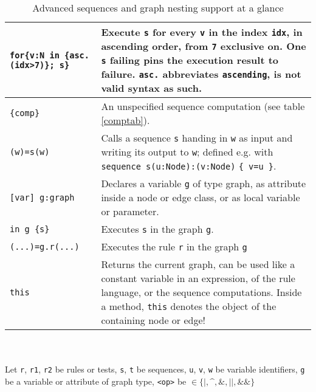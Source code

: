 \begin{table}[htbp]
\begin{minipage}{\linewidth}
\begin{tabularx}{\linewidth}{|lX|}
\texttt{for\{v:N in \{asc.(idx>7)\}; s\}} & Execute \texttt{s} for every \texttt{v} in the index \texttt{idx}, in ascending order, from \texttt{7} exclusive on. One \texttt{s} failing pins the execution result to failure. \texttt{asc.} abbreviates \texttt{ascending}, is not valid syntax as such.\\
\hline
\texttt{\{comp\}}	& An unspecified sequence computation (see table \ref{comptab}).\\
\hline
\texttt{(w)=s(w)} & Calls a sequence \texttt{s} handing in \texttt{w} as input and writing its output to \texttt{w}; defined e.g. with \texttt{sequence s(u:Node):(v:Node)} \texttt{\{ v=u \}}.\\
\hline
\hline
\texttt{[var] g:graph}	& Declares a variable \texttt{g} of type graph, as attribute inside a node or edge class, or as local variable or parameter.\\
\hline
\texttt{in g \{s\}}	& Executes \texttt{s} in the graph \texttt{g}.\\
\hline
\texttt{(...)=g.r(...)} & Executes the rule \texttt{r} in the graph \texttt{g}\\
\hline
\texttt{this} & Returns the current graph, can be used like a constant variable in an expression, of the rule language, or the sequence computations. Inside a method, \texttt{this} denotes the object of the containing node or edge!\\
\hline
\end{tabularx}\indexmain{\texttt{<>}}\indexmain{\texttt{<<;>>}}
\end{minipage}\\
\\ 
{\small Let \texttt{r}, \texttt{r1}, \texttt{r2} be rules or tests, \texttt{s}, \texttt{t} be sequences, \texttt{u}, \texttt{v}, \texttt{w} be variable identifiers, \texttt{g} be a variable or attribute of graph type, \texttt{<op>} be $\in \{\texttt{|}, \texttt{\textasciicircum}, \texttt{\&}, \texttt{||}, \texttt{\&\&}\}$ }%
\caption{Advanced sequences and graph nesting support at a glance}
\label{seqtab}
\end{table}
 
